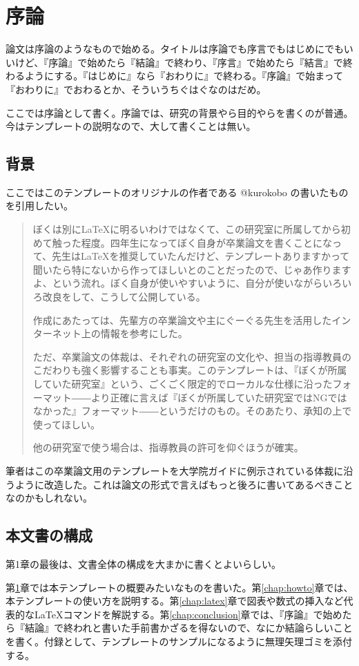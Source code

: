\chapter{序論}
\label{chap:introduction}

論文は序論のようなもので始める。タイトルは序論でも序言でもはじめにでもいいけど、『序論』で始めたら『結論』で終わり、『序言』で始めたら『結言』で終わるようにする。『はじめに』なら『おわりに』で終わる。『序論』で始まって『おわりに』でおわるとか、そういうちぐはぐなのはだめ。

ここでは序論として書く。序論では、研究の背景やら目的やらを書くのが普通。今はテンプレートの説明なので、大して書くことは無い。


\section{背景}

ここではこのテンプレートのオリジナルの作者である @kurokobo の書いたもの\cite{kurokobo10}を引用したい。

\begin{quotation}
ぼくは別に\LaTeX に明るいわけではなくて、この研究室に所属してから初めて触った程度。四年生になってぼく自身が卒業論文を書くことになって、先生は\LaTeX を推奨していたんだけど、テンプレートありますかって聞いたら特にないから作ってほしいとのことだったので、じゃあ作りますよ、という流れ。ぼく自身が使いやすいように、自分が使いながらいろいろ改良をして、こうして公開している。

作成にあたっては、先輩方の卒業論文や主にぐーぐる先生を活用したインターネット上の情報を参考にした。

ただ、卒業論文の体裁は、それぞれの研究室の文化や、担当の指導教員のこだわりも強く影響することも事実。このテンプレートは、『ぼくが所属していた研究室』という、ごくごく限定的でローカルな仕様に沿ったフォーマット――より正確に言えば『ぼくが所属していた研究室ではNGではなかった』フォーマット――というだけのもの。そのあたり、承知の上で使ってほしい。

他の研究室で使う場合は、指導教員の許可を仰ぐほうが確実。
\end{quotation}

筆者はこの卒業論文用のテンプレートを大学院ガイドに例示されている体裁\cite{mag_guide12}に沿うように改造した。これは論文の形式で言えばもっと後ろに書いてあるべきことなのかもしれない。

\section{本文書の構成}

第1章の最後は、文書全体の構成を大まかに書くとよいらしい。

第\ref{chap:introduction}章では本テンプレートの概要みたいなものを書いた。第\ref{chap:howto}章では、本テンプレートの使い方を説明する。第\ref{chap:latex}章で図表や数式の挿入など代表的な\LaTeX コマンドを解説する。第\ref{chap:conclusion}章では、『序論』で始めたら『結論』で終われと書いた手前書かざるを得ないので、なにか結論らしいことを書く。付録として、テンプレートのサンプルになるように無理矢理ゴミを添付する。
